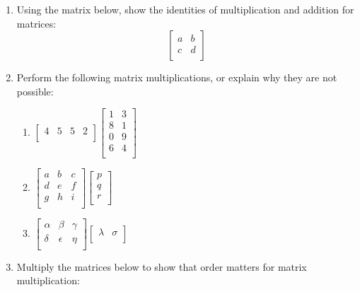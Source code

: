 \documentclass[11pt]{article}
\begin{document}
\begin{enumerate}
\item Using the matrix below, show the identities of multiplication and addition for matrices:
\[
\left[\begin{array}{cc}
a & b \\
c & d \\
\end{array}\right]
\]



\item Perform the following matrix multiplications, or explain why they are not possible:
\begin{enumerate}
\item $\left[\begin{array}{cccc}
4 & 5 & 5 & 2 \\
\end{array}\right]
\left[\begin{array}{cc}
1 & 3 \\
8 & 1 \\
0 & 9 \\
6 & 4 \\
\end{array}\right]$
\item $\left[\begin{array}{ccc}
a & b & c \\
d & e & f \\
g & h & i \\
\end{array}\right]
\left[\begin{array}{c}
p \\
q \\
r \\
\end{array}\right]$
\item $\left[\begin{array}{ccc}
\alpha & \beta    & \gamma \\
\delta & \epsilon & \eta \\
\end{array}\right]
\left[\begin{array}{cc}
\lambda & \sigma \\
\end{array}\right]$
\end{enumerate}




\item Multiply the matrices below to show that order matters for matrix multiplication: 


\end{enumerate}
\end{document}
